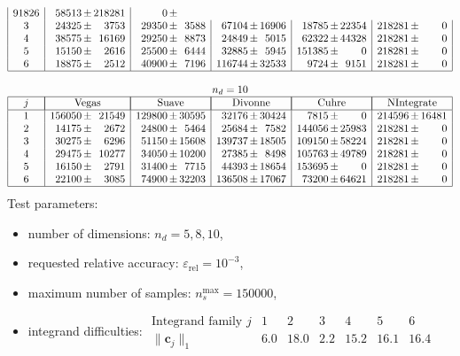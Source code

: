 \documentclass[12pt]{article}
\newcommand\epsrel{\varepsilon_{\text{rel}}}
\newcommand\nmax{n_s^{\text{max}}}
\newcommand\dvec[1]{\mathbf{#1}}
\newcommand\norm[1]{\|#1\|_1}
\begin{document}
\begin{table}
$$\begin{array}{|c|r@{\,\pm\,}r|r@{\,\pm\,}r|r@{\,\pm\,}r
                |r@{\,\pm\,}r|r@{\,\pm\,}r|}
     91826 & 58513 &
    218281 &     0 \\
3 &  24325 &  3753 &
     29350 &  3588 & 
     67104 & 16906 & 
     18785 & 22354 &
    218281 &     0 \\
4 &  38575 & 16169 & 
     29250 &  8873 &
     24849 &  5015 &
     62322 & 44328 &
    218281 &     0 \\
5 &  15150 &  2616 &
     25500 &  6444 &
     32885 &  5945 &
    151385 &     0 &
    218281 &     0 \\
6 &  18875 &  2512 &
     40900 &  7196 &
    116744 & 32533 &    
      9724 &  9151 &
    218281 &     0 \\ \hline
\multicolumn{11}{c}{} \\
\multicolumn{11}{c}{n_d = 10} \\ \hline
j &
\multicolumn{2}{|c|}{\text{Vegas}} &
\multicolumn{2}{|c|}{\text{Suave}} &
\multicolumn{2}{|c|}{\text{Divonne}} &
\multicolumn{2}{|c|}{\text{Cuhre}} &
\multicolumn{2}{|c|}{\text{NIntegrate}} \\ \hline
1 & 156050 & 21549 & 
    129800 & 30595 & 
     32176 & 30424 & 
      7815 &     0 &
    214596 & 16481 \\
2 &  14175 &  2672 &
     24800 &  5464 &
     25684 &  7582 &
    144056 & 25983 &
    218281 &     0 \\
3 &  30275 &  6296 &
     51150 & 15608 & 
    139737 & 18505 & 
    109150 & 58224 &
    218281 &     0 \\
4 &  29475 & 10277 &
     34050 & 10200 & 
     27385 &  8498 &
    105763 & 49789 & 
    218281 &     0 \\
5 &  16150 &  2791 &
     31400 &  7715 &
     44393 & 18654 & 
    153695 &     0 & 
    218281 &     0 \\
6 &  22100 &  3085 &
     74900 & 32203 &
    136508 & 17067 & 
     73200 & 64621 &
    218281 &     0 \\ \hline
\end{array}
$$
Test parameters:
\begin{itemize}
\item number of dimensions: $n_d = 5, 8, 10$,
\item requested relative accuracy: $\epsrel = 10^{-3}$,
\item maximum number of samples: $\nmax = 150000$,
\item integrand difficulties:
$
\begin{array}{r||c|c|c|c|c|c}
\text{Integrand family }j &  1  &  2   &  3  &  4   &  5   &  6  \\ 
\hline
\norm{\dvec c_j}          & 6.0 & 18.0 & 2.2 & 15.2 & 16.1 & 16.4
\end{array}
$
\end{itemize}


\end{table}
\end{document}
